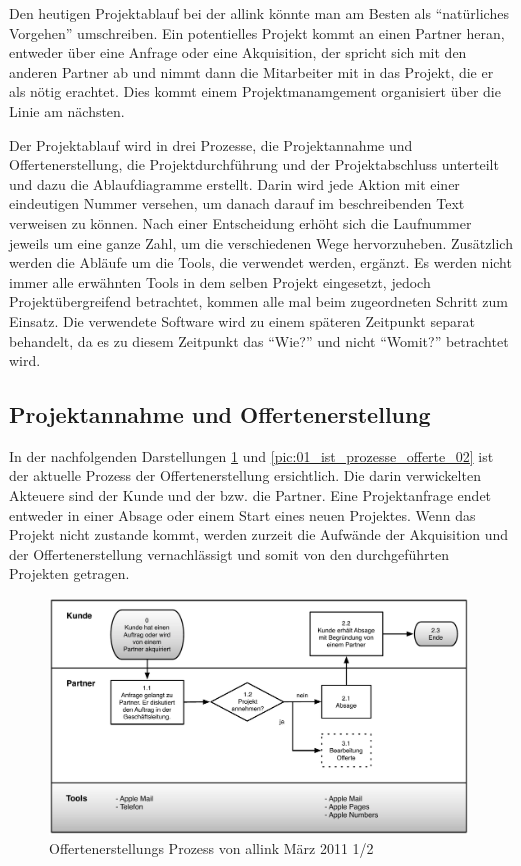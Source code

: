 Den heutigen Projektablauf bei der allink könnte man am Besten als ``natürliches Vorgehen''
umschreiben. Ein potentielles Projekt kommt an einen Partner heran, entweder über 
eine Anfrage oder eine Akquisition, der spricht sich mit den anderen Partner ab 
und nimmt dann die Mitarbeiter mit in das Projekt, die er als nötig erachtet.
Dies kommt einem Projektmanamgement organisiert über die Linie am nächsten.

Der Projektablauf wird in drei Prozesse, die Projektannahme und Offertenerstellung,
die Projektdurchführung und der Projektabschluss unterteilt und dazu die 
Ablaufdiagramme erstellt. Darin wird jede Aktion mit einer eindeutigen Nummer versehen,
um danach darauf im beschreibenden Text verweisen zu können. Nach einer Entscheidung erhöht
sich die Laufnummer jeweils um eine ganze Zahl, um die verschiedenen Wege hervorzuheben.
Zusätzlich werden die Abläufe um die Tools, die verwendet werden, ergänzt.
Es werden nicht immer alle erwähnten Tools in dem selben Projekt eingesetzt,
jedoch Projektübergreifend betrachtet, kommen alle mal beim zugeordneten Schritt 
zum Einsatz. Die verwendete Software wird zu einem späteren Zeitpunkt separat
behandelt, da es zu diesem Zeitpunkt das ``Wie?'' und nicht ``Womit?'' betrachtet
wird.

\subsection{Projektannahme und Offertenerstellung}
In der nachfolgenden Darstellungen \ref{pic:01_ist_prozesse_offerte_01} und
\ref{pic:01_ist_prozesse_offerte_02} ist der aktuelle Prozess der Offertenerstellung 
ersichtlich. Die darin verwickelten Akteuere sind der Kunde und der bzw. die Partner.
Eine Projektanfrage endet entweder in einer Absage oder einem Start eines neuen 
Projektes. Wenn das Projekt nicht zustande kommt, werden zurzeit die Aufwände der
Akquisition und der Offertenerstellung vernachlässigt und somit von
den durchgeführten Projekten getragen.

\begin{figure}[htbp]
\begin{center}
\includegraphics[width=0.99\textwidth,angle=0]{./bilder/analyse/01_ist_prozesse_offerte_01.pdf}
\caption{Offertenerstellungs Prozess von allink März 2011 1/2}
\label{pic:01_ist_prozesse_offerte_01}
\end{center}
\end{figure}

